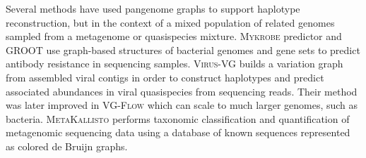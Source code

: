 Several methods have used pangenome graphs to support haplotype reconstruction, but in the context of a mixed population of related genomes sampled from a metagenome or quasispecies mixture.
\textsc{Mykrobe} predictor \cite{Bradley2015-kl} and \textsc{GROOT} \cite{Rowe2018-bg} use graph-based structures of bacterial genomes and gene sets to predict antibody resistance in sequencing samples.
\textsc{Virus-VG} \cite{Baaijens2019-ng} builds a variation graph from assembled viral contigs in order to construct haplotypes and predict associated abundances in viral quasispecies from sequencing reads.
Their method was later improved in \textsc{VG-Flow} \cite{Baaijens2019-ha} which can scale to much larger genomes, such as bacteria.  
\textsc{MetaKallisto} \cite{Schaeffer2017-fh} performs taxonomic classification and quantification of metagenomic sequencing data using a database of known sequences represented as colored de Bruijn graphs.







